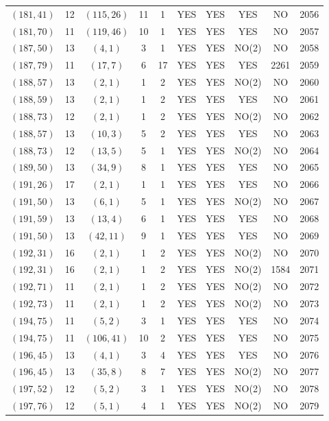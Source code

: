 \begin{longtable}{|c|c|c|c|c|c|c|c|c|c|}
$(181, 41)$ & 12 & $(115, 26)$ & 11 & 1 & YES & YES & YES & NO & 2056\\
$(181, 70)$ & 11 & $(119, 46)$ & 10 & 1 & YES & YES & YES & NO & 2057\\
$(187, 50)$ & 13 & $(4, 1)$ & 3 & 1 & YES & YES & NO(2) & NO & 2058\\
$(187, 79)$ & 11 & $(17, 7)$ & 6 & 17 & YES & YES & YES & 2261 & 2059\\
$(188, 57)$ & 13 & $(2, 1)$ & 1 & 2 & YES & YES & NO(2) & NO & 2060\\
$(188, 59)$ & 13 & $(2, 1)$ & 1 & 2 & YES & YES & YES & NO & 2061\\
$(188, 73)$ & 12 & $(2, 1)$ & 1 & 2 & YES & YES & NO(2) & NO & 2062\\
$(188, 57)$ & 13 & $(10, 3)$ & 5 & 2 & YES & YES & YES & NO & 2063\\
$(188, 73)$ & 12 & $(13, 5)$ & 5 & 1 & YES & YES & NO(2) & NO & 2064\\
$(189, 50)$ & 13 & $(34, 9)$ & 8 & 1 & YES & YES & YES & NO & 2065\\
$(191, 26)$ & 17 & $(2, 1)$ & 1 & 1 & YES & YES & YES & NO & 2066\\
$(191, 50)$ & 13 & $(6, 1)$ & 5 & 1 & YES & YES & NO(2) & NO & 2067\\
$(191, 59)$ & 13 & $(13, 4)$ & 6 & 1 & YES & YES & YES & NO & 2068\\
$(191, 50)$ & 13 & $(42, 11)$ & 9 & 1 & YES & YES & YES & NO & 2069\\
$(192, 31)$ & 16 & $(2, 1)$ & 1 & 2 & YES & YES & NO(2) & NO & 2070\\
$(192, 31)$ & 16 & $(2, 1)$ & 1 & 2 & YES & YES & NO(2) & 1584 & 2071\\
$(192, 71)$ & 11 & $(2, 1)$ & 1 & 2 & YES & YES & NO(2) & NO & 2072\\
$(192, 73)$ & 11 & $(2, 1)$ & 1 & 2 & YES & YES & NO(2) & NO & 2073\\
$(194, 75)$ & 11 & $(5, 2)$ & 3 & 1 & YES & YES & YES & NO & 2074\\
$(194, 75)$ & 11 & $(106, 41)$ & 10 & 2 & YES & YES & YES & NO & 2075\\
$(196, 45)$ & 13 & $(4, 1)$ & 3 & 4 & YES & YES & YES & NO & 2076\\
$(196, 45)$ & 13 & $(35, 8)$ & 8 & 7 & YES & YES & NO(2) & NO & 2077\\
$(197, 52)$ & 12 & $(5, 2)$ & 3 & 1 & YES & YES & NO(2) & NO & 2078\\
$(197, 76)$ & 12 & $(5, 1)$ & 4 & 1 & YES & YES & NO(2) & NO & 2079\\

\end{longtable}
